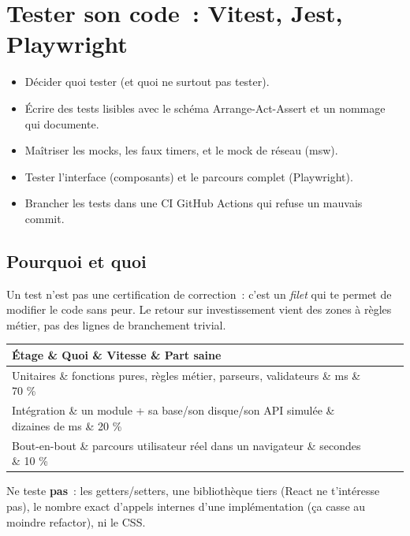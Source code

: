 \documentclass[12pt,a4paper,twoside,openright]{book}
\makeatletter
\newenvironment{tabz}[1]{\rowcolors{2}{white}{tralight}%
  \small\setlength{\tabcolsep}{5pt}\setlength{\LTpre}{3pt}\setlength{\LTpost}{3pt}%
  \begin{longtable}{@{}#1@{}}\toprule}
  {\bottomrule\end{longtable}\normalfont\setlength{\tabcolsep}{6pt}}
\newcommand{\thd}[1]{\textbf{\color{white}#1}}
\newcommand{\headrow}{\rowcolor{theadbg}}
\makeatother
\begin{document}
\chapter{Tester son code~: Vitest, Jest, Playwright}
\label{ch-js-tests}

\begin{objectif}
\begin{itemize}
  \item D\'ecider quoi tester (et quoi ne surtout pas tester).
  \item \'Ecrire des tests lisibles avec le sch\'ema Arrange-Act-Assert et un nommage qui documente.
  \item Ma\^itriser les mocks, les faux timers, et le mock de r\'eseau (msw).
  \item Tester l'interface (composants) et le parcours complet (Playwright).
  \item Brancher les tests dans une CI GitHub Actions qui refuse un mauvais commit.
\end{itemize}
\end{objectif}

\section{Pourquoi et quoi}

Un test n'est pas une certification de correction~: c'est un \emph{filet} qui te permet de
modifier le code sans peur. Le retour sur investissement vient des zones \`a r\`egles m\'etier,
pas des lignes de branchement trivial.

\begin{tabz}{lXll}
  \headrow \thd{\'Etage} \& \thd{Quoi} \& \thd{Vitesse} \& \thd{Part saine} \\
  \midrule
  Unitaires \& fonctions pures, r\`egles m\'etier, parseurs, validateurs \& ms \& 70 \% \\
  Int\'egration \& un module + sa base/son disque/son API simul\'ee \& dizaines de ms \& 20 \% \\
  Bout-en-bout \& parcours utilisateur r\'eel dans un navigateur \& secondes \& 10 \% \\
\end{tabz}

Ne teste \textbf{pas}~: les getters/setters, une biblioth\`eque tiers (React ne t'int\'eresse pas),
le nombre exact d'appels internes d'une impl\'ementation (\c{c}a casse au moindre refactor), ni le CSS.
\end{document}
